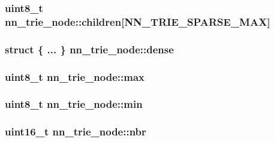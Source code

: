 \subsubsection[{children}]{\setlength{\rightskip}{0pt plus 5cm}uint8\+\_\+t nn\+\_\+trie\+\_\+node\+::children\mbox{[}{\bf N\+N\+\_\+\+T\+R\+I\+E\+\_\+\+S\+P\+A\+R\+S\+E\+\_\+\+M\+AX}\mbox{]}}\hypertarget{structnn__trie__node_a452a8682dddb092a2a60fa43c15aaee6}{}\label{structnn__trie__node_a452a8682dddb092a2a60fa43c15aaee6}
\subsubsection[{dense}]{\setlength{\rightskip}{0pt plus 5cm}struct \{ ... \}   nn\+\_\+trie\+\_\+node\+::dense}\hypertarget{structnn__trie__node_a431468d12b2188d837c28b75be39e323}{}\label{structnn__trie__node_a431468d12b2188d837c28b75be39e323}
\subsubsection[{max}]{\setlength{\rightskip}{0pt plus 5cm}uint8\+\_\+t nn\+\_\+trie\+\_\+node\+::max}\hypertarget{structnn__trie__node_ad164df8e7446669447ce5c8d6575fdc0}{}\label{structnn__trie__node_ad164df8e7446669447ce5c8d6575fdc0}
\subsubsection[{min}]{\setlength{\rightskip}{0pt plus 5cm}uint8\+\_\+t nn\+\_\+trie\+\_\+node\+::min}\hypertarget{structnn__trie__node_a105e3aba00cda22951192c6fb12b43b8}{}\label{structnn__trie__node_a105e3aba00cda22951192c6fb12b43b8}
\subsubsection[{nbr}]{\setlength{\rightskip}{0pt plus 5cm}uint16\+\_\+t nn\+\_\+trie\+\_\+node\+::nbr}\hypertarget{structnn__trie__node_aa1b62c9e7cff55e4b2284124345c03ec}{}\label{structnn__trie__node_aa1b62c9e7cff55e4b2284124345c03ec}
